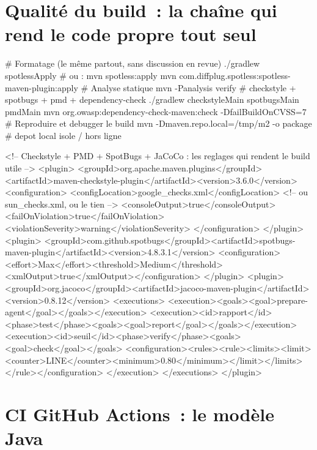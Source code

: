 \documentclass[12pt,a4paper,twoside,openright]{book}
\begin{document}
\section{Qualit\'e du build~: la cha\^ine qui rend le code propre tout seul}

\begin{terminal}
# Formatage (le m\^eme partout, sans discussion en revue)
./gradlew spotlessApply            # ou : mvn spotless:apply
mvn com.diffplug.spotless:spotless-maven-plugin:apply
# Analyse statique
mvn -Panalysis verify              # checkstyle + spotbugs + pmd + dependency-check
./gradlew checkstyleMain spotbugsMain pmdMain
mvn org.owasp:dependency-check-maven:check -DfailBuildOnCVSS=7
# Reproduire et debugger le build
mvn -Dmaven.repo.local=/tmp/m2 -o package      # depot local isole / hors ligne
\end{terminal}

\begin{codeconf}
<!-- Checkstyle + PMD + SpotBugs + JaCoCo : les reglages qui rendent le build utile -->
<plugin>
  <groupId>org.apache.maven.plugins</groupId><artifactId>maven-checkstyle-plugin</artifactId><version>3.6.0</version>
  <configuration>
    <configLocation>google_checks.xml</configLocation>       <!-- ou sun_checks.xml, ou le tien -->
    <consoleOutput>true</consoleOutput><failOnViolation>true</failOnViolation>
    <violationSeverity>warning</violationSeverity>
  </configuration>
</plugin>
<plugin>
  <groupId>com.github.spotbugs</groupId><artifactId>spotbugs-maven-plugin</artifactId><version>4.8.3.1</version>
  <configuration><effort>Max</effort><threshold>Medium</threshold><xmlOutput>true</xmlOutput></configuration>
</plugin>
<plugin>
  <groupId>org.jacoco</groupId><artifactId>jacoco-maven-plugin</artifactId><version>0.8.12</version>
  <executions>
    <execution><goals><goal>prepare-agent</goal></goals></execution>
    <execution><id>rapport</id><phase>test</phase><goals><goal>report</goal></goals></execution>
    <execution><id>seuil</id><phase>verify</phase><goals><goal>check</goal></goals>
      <configuration><rules><rule><limits><limit><counter>LINE</counter><minimum>0.80</minimum></limit></limits></rule></configuration>
    </execution>
  </executions>
</plugin>
\end{codeconf}

\section{CI GitHub Actions~: le mod\`ele Java}
\end{document}

